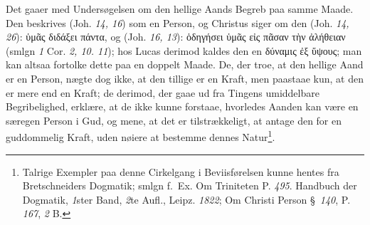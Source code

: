 \documentclass[12pt]{book}
\begin{document}
Det gaaer med Undersøgelsen om den hellige Aands Begreb paa samme Maade. Den
beskrives (Joh. \textit{14, 16}) som en Person, og Christus siger om den (Joh.
\textit{14, 26}): ὑμᾶς διδάξει πάντα, og (Joh. \textit{16, 13}): ὁδηγήσει ὑμᾶς
εἰς πᾶσαν τὴν ἀλήθειαν (smlgn \textit{1} Cor. \textit{2, 10. 11}); hos Lucas
derimod kaldes den en δύναμις ἐξ ὕψους; man kan altsaa fortolke dette paa en
doppelt Maade. De, der troe, at den hellige Aand er en Person, nægte dog ikke,
at den tillige er en Kraft, men paastaae kun, at den er mere end en Kraft; de
derimod, der gaae ud fra Tingens umiddelbare Begribelighed, erklære, at de
ikke kunne forstaae, hvorledes Aanden kan være en særegen Person i Gud, og
mene, at det er tilstrækkeligt, at antage den for en guddommelig Kraft, uden
nøiere at bestemme dennes Natur\footnote{Talrige Exempler paa denne Cirkelgang
i Beviisførelsen kunne hentes fra Bretschneiders Dogmatik; smlgn f.~Ex. Om
Triniteten P. \textit{495}. Handbuch der Dogmatik, \textit{1}ster Band,
\textit{2}te Aufl., Leipz. \textit{1822}; Om Christi Person §~\textit{140}, P.
\textit{167}, \textit{2} B.}.
\end{document}
